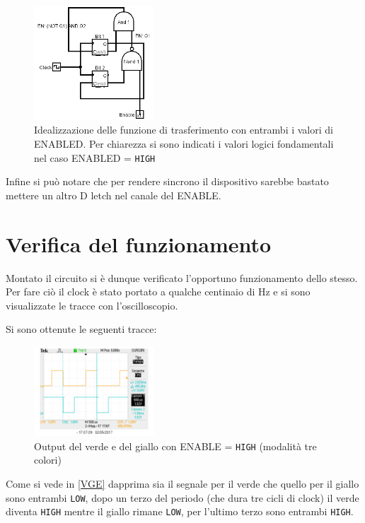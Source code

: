 \documentclass[a4paper,10pt]{article}
\def\code#1{\texttt{#1}}
\begin{document}
\begin{figure}[H]
	\centering
	\includegraphics[width=0.4\textwidth]{../grafici/solologica1.png}
	\caption{Idealizzazione delle funzione di trasferimento con entrambi i valori di ENABLED. Per chiarezza si sono indicati i valori logici fondamentali nel caso ENABLED = \code{HIGH}}
	\label{fig:solologica}
\end{figure}


Infine si può notare che per rendere sincrono il dispositivo sarebbe bastato mettere un altro D letch nel canale del ENABLE. 


\section{Verifica del funzionamento}

Montato il circuito si è dunque verificato l'opportuno funzionamento dello stesso. Per fare ciò il clock è stato portato a qualche centinaio di Hz e si sono visualizzate le tracce con l'oscilloscopio.

Si sono ottenute le seguenti tracce:


\begin{figure}[H]
	\centering
	\includegraphics[width=0.4\textwidth]{../grafici/verde_giallo.png}
	\caption{Output del verde e del giallo con ENABLE = \code{HIGH} (modalità tre colori)}
	\label{fig:VGE}
\end{figure}

Come si vede in \cref{VGE} dapprima sia il segnale per il verde che quello per il giallo sono entrambi \code{LOW}, dopo un terzo del periodo (che dura tre cicli di clock) il verde diventa \code{HIGH} mentre il giallo rimane \code{LOW}, per l'ultimo terzo sono entrambi \code{HIGH}.
\end{document}
